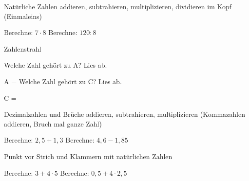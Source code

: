 \setcounter{aufgabe}{0}

\begin{aufgabe}{Natürliche Zahlen addieren, subtrahieren, multiplizieren, dividieren im Kopf (Einmaleins)}
\begin{teile}
\teil Berechne: $7 \cdot 8$ \leerfeld
\teil Berechne: $120 : 8$ \leerfeld
\end{teile}
\end{aufgabe}

\begin{aufgabe}{Zahlenstrahl}
\begin{teile}
\teil Welche Zahl gehört zu A? Lies ab.

A = \leerfeld
\teil Welche Zahl gehört zu C? Lies ab.

C = \leerfeld
\end{teile}
\end{aufgabe}

\begin{aufgabe}{Dezimalzahlen und Brüche addieren, subtrahieren, multiplizieren (Kommazahlen addieren, Bruch mal ganze Zahl)}
\begin{teile}
\teil Berechne: $2{,}5 + 1{,}3$ \leerfeld
\teil Berechne: $4{,}6 - 1{,}85$ \leerfeld
\end{teile}
\end{aufgabe}

\begin{aufgabe}{Punkt vor Strich und Klammern mit natürlichen Zahlen}
\begin{teile}
\teil Berechne: $3 + 4 \cdot 5$ \leerfeld
\teil Berechne: $0{,}5 + 4 \cdot 2{,}5$ \leerfeld
\end{teile}
\end{aufgabe}

